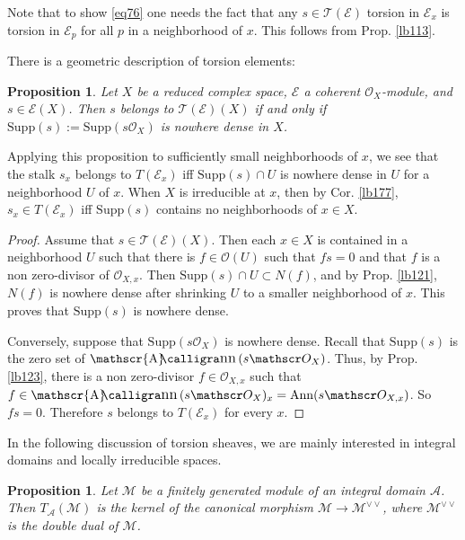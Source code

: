 \documentclass[12pt,b5paper,notitlepage]{report}
\theoremstyle{definition}
\theoremstyle{plain}
\newtheorem{pp}[df]{Proposition}
\DeclareMathOperator{\sann}{\mathscr{A}\text{\kern -3pt {\calligra\large nn}}\,}
\newcommand{\mc}{\mathcal}
\newcommand{\scr}{\mathscr}
\newcommand{\Ann}{\mathrm{Ann}}
\newcommand{\Supp}{\mathrm{Supp}}
\numberwithin{equation}{section}
\begin{document}
Note that to show \eqref{eq76} one needs the fact that any $s\in\scr T(\scr E)$ torsion in $\scr E_x$ is torsion in $\scr E_p$ for all $p$ in a neighborhood of $x$. This follows from Prop. \ref{lb113}.



There is a geometric description of torsion elements:

\begin{pp}\label{lb354}
Let $X$ be a reduced complex space, $\scr E$ a coherent $\scr O_X$-module, and $s\in\scr E(X)$. Then $s$ belongs to $\scr T(\scr E)(X)$ if and only if $\Supp(s):=\Supp(s\scr O_X)$ is nowhere dense in $X$.
\end{pp}

Applying this proposition to sufficiently small neighborhoods of $x$, we see that the stalk $s_x$ belongs to $T(\scr E_x)$ iff $\Supp(s)\cap U$ is nowhere dense in $U$ for a neighborhood $U$ of $x$. When $X$ is irreducible at $x$, then by Cor. \ref{lb177}, $s_x\in T(\scr E_x)$ iff $\Supp(s)$ contains no neighborhoods of $x\in X$.

\begin{proof}
Assume that $s\in\scr T(\scr E)(X)$. Then each $x\in X$ is contained in a neighborhood $U$ such that there is $f\in\scr O(U)$ such that $fs=0$ and that $f$ is a non zero-divisor of $\scr O_{X,x}$. Then $\Supp(s)\cap U\subset N(f)$, and by Prop. \ref{lb121}, $N(f)$ is nowhere dense after shrinking $U$ to a smaller neighborhood of $x$. This proves that $\Supp(s)$ is nowhere dense.

Conversely, suppose that $\Supp(s\scr O_X)$ is nowhere dense. Recall that $\Supp(s)$ is the zero set of $\sann(s\scr O_X)$. Thus, by Prop. \ref{lb123}, there is a non zero-divisor $f\in\scr O_{X,x}$ such that $f\in\sann(s\scr O_X)_x=\Ann(s\scr O_{X,x})$. So $fs=0$. Therefore $s$ belongs to $T(\scr E_x)$ for every $x$.
\end{proof}




In the following discussion of torsion sheaves, we are mainly interested in integral domains and locally irreducible spaces.


\begin{pp}
Let $\mc M$ be a finitely generated module of an integral domain $\mc A$. Then $T_{\mc A}(\mc M)$ is the kernel of the canonical morphism $\mc M\rightarrow\mc M^{\vee\vee}$, where $\mc M^{\vee\vee}$ is the double dual of $\mc M$. 
\end{pp}
\end{document}
